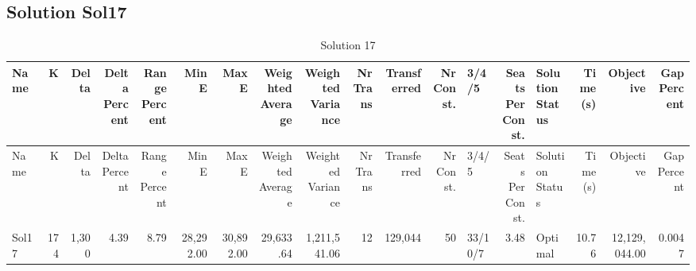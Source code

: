 \documentclass[a4paper]{article}
\begin{document}
\clearpage
\subsection{Solution Sol17}

{\scriptsize
\begin{longtable}{lrrrrrrrrrrrlrlrrr}
\caption{Solution 17}
\\ \toprule
Name &K &Delta &\shortstack{Delta\\Percent} &\shortstack{Range\\Percent} &Min E &Max E &\shortstack{Weighted\\Average} &\shortstack{Weighted\\Variance} &\shortstack{Nr\\Trans} &Transferred &\shortstack{Nr\\Const.} &3/4/5 &\shortstack{Seats\\Per\\Const.} &\shortstack{Solution\\Status} &\shortstack{Time\\(s)} &Objective &\shortstack{Gap\\Percent} \\ \midrule
\endfirsthead
\toprule
Name &K &Delta &\shortstack{Delta\\Percent} &\shortstack{Range\\Percent} &Min E &Max E &\shortstack{Weighted\\Average} &\shortstack{Weighted\\Variance} &\shortstack{Nr\\Trans} &Transferred &\shortstack{Nr\\Const.} &3/4/5 &\shortstack{Seats\\Per\\Const.} &\shortstack{Solution\\Status} &\shortstack{Time\\(s)} &Objective &\shortstack{Gap\\Percent} \\ \midrule
\endhead
\bottomrule
\endfoot
Sol17&174&1,300& 4.39& 8.79&28,292.00&30,892.00&29,633.64&1,211,541.06&12&129,044&50&33/10/7& 3.48&Optimal&10.76&12,129,044.00&0.0047\\ 
\end{longtable}

}
\end{document}
